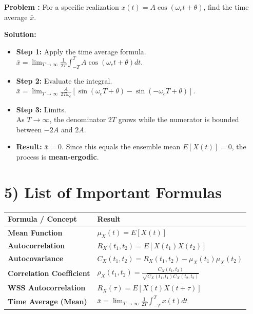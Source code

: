 \documentclass[11pt]{article}
\begin{document}
\textbf{Problem :} For a specific realization $x(t) = A \cos(\omega_c t + \theta)$, find the time average $\bar{x}$.

\vspace{0.2cm}
\noindent \textbf{Solution:} 
\begin{itemize}
    \item \textbf{Step 1:} Apply the time average formula. \\
    $\bar{x} = \lim_{T \to \infty} \frac{1}{2T} \int_{-T}^{T} A \cos(\omega_c t + \theta) dt$.
    \item \textbf{Step 2:} Evaluate the integral. \\
    $\bar{x} = \lim_{T \to \infty} \frac{A}{2T \omega_c} [\sin(\omega_c T + \theta) - \sin(-\omega_c T + \theta)]$.
    \item \textbf{Step 3:} Limits. \\
    As $T \to \infty$, the denominator $2T$ grows while the numerator is bounded between $-2A$ and $2A$.
    \item \textbf{Result:} $\bar{x} = 0$. Since this equals the ensemble mean $E[X(t)] = 0$, the process is \textbf{mean-ergodic}.
\end{itemize}
\newpage
\section*{5) List of Important Formulas}
\begin{table}[h!]
\centering
\renewcommand{\arraystretch}{1.5}
\setlength{\tabcolsep}{12pt}
\begin{tabular}{ll}
\toprule
\textbf{Formula / Concept} & \textbf{Result} \\
\midrule
\textbf{Mean Function} & $\mu_X(t) = E[X(t)]$ \\
\textbf{Autocorrelation} & $R_X(t_1, t_2) = E[X(t_1)X(t_2)]$ \\
\textbf{Autocovariance} & $C_X(t_1, t_2) = R_X(t_1, t_2) - \mu_X(t_1)\mu_X(t_2)$ \\
\textbf{Correlation Coefficient} & $\rho_X(t_1, t_2) = \frac{C_X(t_1, t_2)}{\sqrt{C_X(t_1, t_1)C_X(t_2, t_2)}}$ \\
\textbf{WSS Autocorrelation} & $R_X(\tau) = E[X(t)X(t+\tau)]$ \\
\textbf{Time Average (Mean)} & $\bar{x} = \lim_{T \to \infty} \frac{1}{2T} \int_{-T}^{T} x(t) dt$ \\
\bottomrule
\end{tabular}
\end{table}
\end{document}
